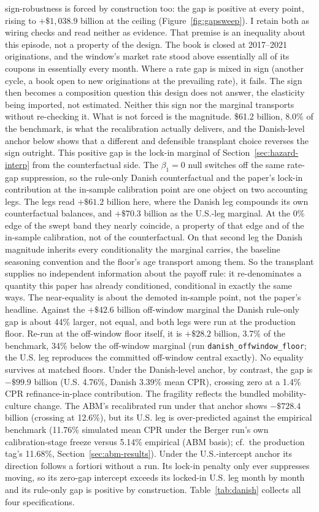 \documentclass[12pt]{article}
\begin{document}
sign-robustness is forced by construction too: the gap is positive at every point, rising to $+\$1{,}038.9$ billion at the ceiling (Figure~\ref{fig:gapsweep}). I retain both as wiring checks and read neither as evidence. That premise is an inequality about this episode, not a property of the design. The book is closed at 2017--2021 originations, and the window's market rate stood above essentially all of its coupons in essentially every month. Where a rate gap is mixed in sign (another cycle, a book open to new originations at the prevailing rate), it fails. The sign then becomes a composition question this design does not answer, the elasticity being imported, not estimated. Neither this sign nor the marginal transports without re-checking it. What is not forced is the magnitude. \$61.2 billion, 8.0\% of the benchmark, is what the recalibration actually delivers, and the Danish-level anchor below shows that a different and defensible transplant choice reverses the sign outright. This positive gap is the lock-in marginal of Section~\ref{sec:hazard-interp} from the counterfactual side. The $\beta_1 = 0$ null switches off the same rate-gap suppression, so the rule-only Danish counterfactual and the paper's lock-in contribution at the in-sample calibration point are one object on two accounting legs. The legs read $+\$61.2$ billion here, where the Danish leg compounds its own counterfactual balances, and $+\$70.3$ billion as the U.S.-leg marginal. At the 0\% edge of the swept band they nearly coincide, a property of that edge and of the in-sample calibration, not of the counterfactual. On that second leg the Danish magnitude inherits every conditionality the marginal carries, the baseline seasoning convention and the floor's age transport among them. So the transplant supplies no independent information about the payoff rule: it re-denominates a quantity this paper has already conditioned, conditional in exactly the same ways. The near-equality is about the demoted in-sample point, not the paper's headline. Against the $+\$42.6$ billion off-window marginal the Danish rule-only gap is about 44\% larger, not equal, and both legs were run at the production floor. Re-run at the off-window floor itself, it is $+\$28.2$ billion, 3.7\% of the benchmark, 34\% below the off-window marginal (run \texttt{danish\_offwindow\_floor}; the U.S. leg reproduces the committed off-window central exactly). No equality survives at matched floors. Under the Danish-level anchor, by contrast, the gap is $-\$99.9$ billion (U.S. 4.76\%, Danish 3.39\% mean CPR), crossing zero at a 1.4\% CPR refinance-in-place contribution. The fragility reflects the bundled mobility-culture change. The ABM's recalibrated run under that anchor shows $-\$728.4$ billion (crossing at 12.6\%), but its U.S. leg is over-predicted against the empirical benchmark (11.76\% simulated mean CPR under the Berger run's own calibration-stage freeze versus 5.14\% empirical (ABM basis); cf.\ the production tag's 11.68\%, Section~\ref{sec:abm-results}). Under the U.S.-intercept anchor its direction follows a fortiori without a run. Its lock-in penalty only ever suppresses moving, so its zero-gap intercept exceeds its locked-in U.S. leg month by month and its rule-only gap is positive by construction. Table~\ref{tab:danish} collects all four specifications.
\end{document}
